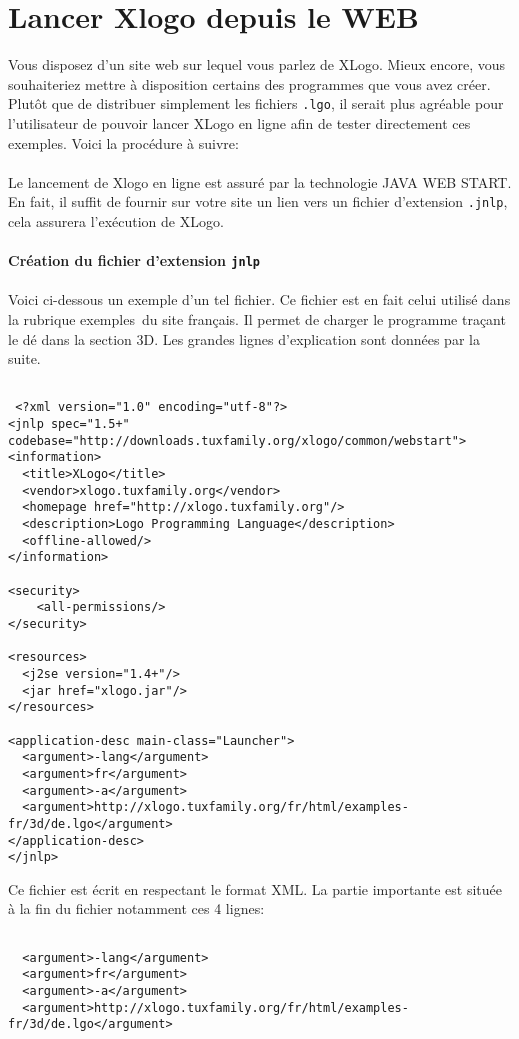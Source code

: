 \chapter{Lancer Xlogo depuis le WEB}
\noindent
Vous disposez d'un site web sur lequel vous parlez de XLogo. Mieux encore, vous souhaiteriez mettre à disposition certains des programmes que vous avez créer. Plutôt que de distribuer simplement les fichiers \texttt{.lgo}, il serait plus agréable pour l'utilisateur de pouvoir lancer XLogo en ligne afin de tester directement ces exemples. Voici la procédure à suivre:\\ \\
Le lancement de Xlogo en ligne est assuré par la technologie \textsc{JAVA WEB START}. En fait, il suffit de fournir sur votre site un lien vers un fichier d'extension \texttt{.jnlp}, cela assurera l'exécution de XLogo.\\ \\
\textbf{Création du fichier d'extension \texttt{jnlp}}\\ \\
Voici ci-dessous un exemple d'un tel fichier. Ce fichier est en fait celui utilisé dans la rubrique \og exemples\fg\ du site français. Il permet de charger le programme traçant le dé dans la section 3D. Les grandes lignes d'explication sont données par la suite.
\begin{verbatim}

 <?xml version="1.0" encoding="utf-8"?>
<jnlp spec="1.5+" codebase="http://downloads.tuxfamily.org/xlogo/common/webstart">
<information>
  <title>XLogo</title>
  <vendor>xlogo.tuxfamily.org</vendor>
  <homepage href="http://xlogo.tuxfamily.org"/>
  <description>Logo Programming Language</description>
  <offline-allowed/>
</information>

<security>
	<all-permissions/>
</security>

<resources>
  <j2se version="1.4+"/>
  <jar href="xlogo.jar"/>
</resources>

<application-desc main-class="Launcher">
  <argument>-lang</argument>
  <argument>fr</argument>
  <argument>-a</argument>
  <argument>http://xlogo.tuxfamily.org/fr/html/examples-fr/3d/de.lgo</argument>
</application-desc>
</jnlp>

\end{verbatim}
Ce fichier est écrit en respectant le format XML. La partie importante est située à la fin du fichier notamment ces 4 lignes:
\begin{verbatim}

  <argument>-lang</argument>
  <argument>fr</argument>
  <argument>-a</argument>
  <argument>http://xlogo.tuxfamily.org/fr/html/examples-fr/3d/de.lgo</argument>

\end{verbatim}
